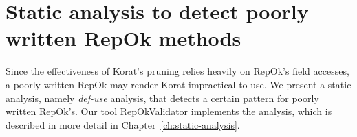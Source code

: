 \begin{comment}
\noindent Formally, reflection can be split into three main aspects \cite{bracha2004mirrors,mostinckx2009mirror}:
\begin{itemize}
\item \emph{Introspection}: the ability of a program to examine itself.
\item \emph{Self-modification}: the ability of a program to alter its structure.
\item \emph{Intercession}: the ability of a program to alter its behaviour.
\end{itemize}

\para Unfettered run-time modification of a system is dangerous, since
it can have subtle, unintended consequences. However careful use of
reflection allows programmers to bend a language to their particular
circumstances rather than the other way round. Most dynamically typed
languages are capable of introspection; many are capable of
self-modification; relatively few are capable of intercession. Korat
is primarily written in Java which is a statically typed language that
only supports the introspective \cite{maes1987concepts} aspects of
reflection.Java Reflection makes it possible to inspect classes,
interfaces, fields and methods at runtime, without knowing the names
of the classes, methods etc. at compile time. It is also possible to
instantiate new objects, invoke methods and \emph{get/set} field
values using reflection.

\para
Korat monitors the field accesses made by the imperative predicate written by the user and prunes the search space accordingly. Since java supports field access using reflection, it is important to make sure that Korat also monitors field accesses using reflection. This property will become more useful when Korat is implemented in a dynamically typed language like ruby/python. 
\end{comment}

\section{Static analysis to detect poorly written RepOk methods}
Since the effectiveness of Korat's pruning relies heavily on RepOk's
field accesses, a poorly written RepOk may render Korat impractical to
use.  We present a static analysis, namely \emph{def-use} analysis,
that detects a certain pattern for poorly written RepOk's.  Our tool
RepOkValidator implements the analysis, which is described in more
detail in Chapter~\ref{ch:static-analysis}.

